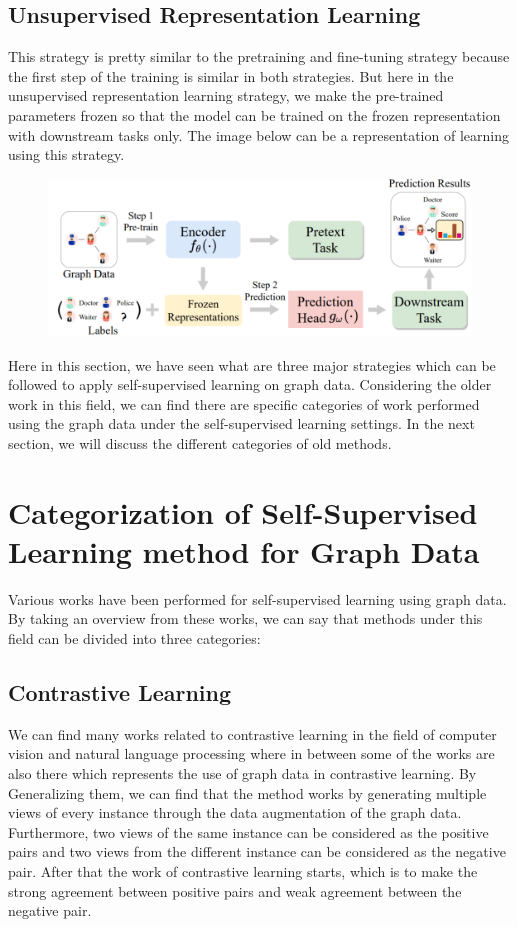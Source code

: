 \documentclass[a4paper,11pt]{report}
\begin{document}
\section{Unsupervised Representation Learning}
This strategy is pretty similar to the pretraining and fine-tuning strategy because the first step of the training is similar in both strategies. But here in the unsupervised representation learning strategy, we make the pre-trained parameters frozen so that the model can be trained on the frozen representation with downstream tasks only. The image below can be a representation of learning using this strategy.
\begin{figure}[h]
	\centering
	\hspace{21pt}
	\includegraphics[width=.70\linewidth]{ssgnn3.png}
	\label{fig:he.jpg}
\end{figure}

Here in this section, we have seen what are three major strategies which can be followed to apply self-supervised learning on graph data. Considering the older work in this field, we can find there are specific categories of work performed using the graph data under the self-supervised learning settings. In the next section, we will discuss the different categories of old methods.

\chapter{Categorization of Self-Supervised Learning method for Graph Data}

Various works have been performed for self-supervised learning using graph data. By taking an overview from these works, we can say that methods under this field can be divided into three categories:

\section{Contrastive Learning}
We can find many works related to contrastive learning in the field of computer vision and natural language processing where in between some of the works are also there which represents the use of graph data in contrastive learning. By Generalizing them, we can find that the method works by generating multiple views of every instance through the data augmentation of the graph data. Furthermore, two views of the same instance can be considered as the positive pairs and two views from the different instance can be considered as the negative pair. After that the work of contrastive learning starts, which is to make the strong agreement between positive pairs and weak agreement between the negative pair.
\end{document}
